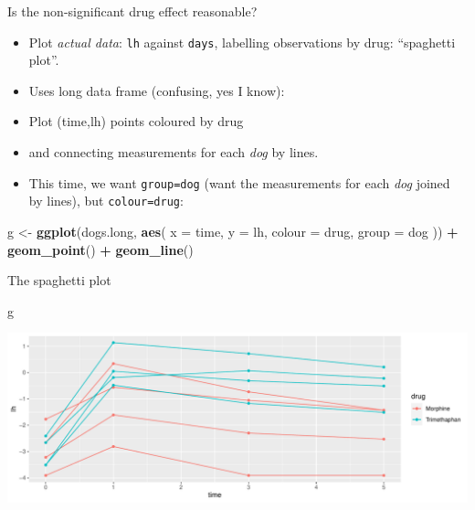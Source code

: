 \documentclass[
  ignorenonframetext,
]{beamer}
\newenvironment{Shaded}{\begin{snugshade}}{\end{snugshade}}
\newcommand{\DataTypeTok}[1]{\textcolor[rgb]{0.13,0.29,0.53}{#1}}
\newcommand{\KeywordTok}[1]{\textcolor[rgb]{0.13,0.29,0.53}{\textbf{#1}}}
\newcommand{\NormalTok}[1]{#1}
\newcommand{\OperatorTok}[1]{\textcolor[rgb]{0.81,0.36,0.00}{\textbf{#1}}}
\newcommand{\StringTok}[1]{\textcolor[rgb]{0.31,0.60,0.02}{#1}}
\begin{document}
\begin{frame}[fragile]{Is the non-significant drug effect reasonable?}
\protect\hypertarget{is-the-non-significant-drug-effect-reasonable}{}

\begin{itemize}
\item
  Plot \emph{actual data}: \texttt{lh} against \texttt{days}, labelling
  observations by drug: ``spaghetti plot''.
\item
  Uses long data frame (confusing, yes I know):
\item
  Plot (time,lh) points coloured by drug
\item
  and connecting measurements for each \emph{dog} by lines.
\item
  This time, we want \texttt{group=dog} (want the measurements for each
  \emph{dog} joined by lines), but \texttt{colour=drug}:
\end{itemize}

\begin{Shaded}
\begin{Highlighting}[]
\NormalTok{g <-}\StringTok{ }\KeywordTok{ggplot}\NormalTok{(dogs.long, }\KeywordTok{aes}\NormalTok{(}
  \DataTypeTok{x =}\NormalTok{ time, }\DataTypeTok{y =}\NormalTok{ lh,}
  \DataTypeTok{colour =}\NormalTok{ drug, }\DataTypeTok{group =}\NormalTok{ dog}
\NormalTok{)) }\OperatorTok{+}
\StringTok{  }\KeywordTok{geom_point}\NormalTok{() }\OperatorTok{+}\StringTok{ }\KeywordTok{geom_line}\NormalTok{()}
\end{Highlighting}
\end{Shaded}

\end{frame}

\begin{frame}[fragile]{The spaghetti plot}
\protect\hypertarget{the-spaghetti-plot}{}

\begin{Shaded}
\begin{Highlighting}[]
\NormalTok{g}
\end{Highlighting}
\end{Shaded}

\includegraphics{slides_d29_files/figure-beamer/hoverla-1.pdf}

\end{frame}
\end{document}
